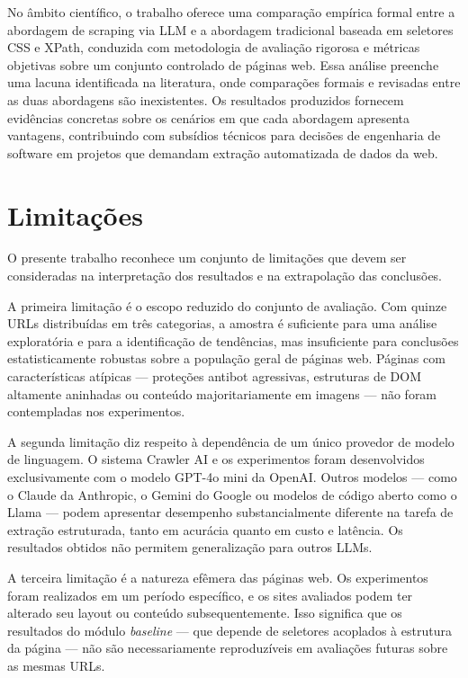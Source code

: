 \documentclass[tcc,capa]{texifsul}
\begin{document}
No âmbito científico, o trabalho oferece uma comparação empírica formal entre a abordagem de scraping via LLM e a abordagem tradicional baseada em seletores CSS e XPath, conduzida com metodologia de avaliação rigorosa e métricas objetivas sobre um conjunto controlado de páginas web. Essa análise preenche uma lacuna identificada na literatura, onde comparações formais e revisadas entre as duas abordagens são inexistentes. Os resultados produzidos fornecem evidências concretas sobre os cenários em que cada abordagem apresenta vantagens, contribuindo com subsídios técnicos para decisões de engenharia de software em projetos que demandam extração automatizada de dados da web.

\section{Limitações}

O presente trabalho reconhece um conjunto de limitações que devem ser consideradas na interpretação dos resultados e na extrapolação das conclusões.

A primeira limitação é o escopo reduzido do conjunto de avaliação. Com quinze URLs distribuídas em três categorias, a amostra é suficiente para uma análise exploratória e para a identificação de tendências, mas insuficiente para conclusões estatisticamente robustas sobre a população geral de páginas web. Páginas com características atípicas — proteções antibot agressivas, estruturas de DOM altamente aninhadas ou conteúdo majoritariamente em imagens — não foram contempladas nos experimentos.

A segunda limitação diz respeito à dependência de um único provedor de modelo de linguagem. O sistema Crawler AI e os experimentos foram desenvolvidos exclusivamente com o modelo GPT-4o mini da OpenAI. Outros modelos — como o Claude da Anthropic, o Gemini do Google ou modelos de código aberto como o Llama — podem apresentar desempenho substancialmente diferente na tarefa de extração estruturada, tanto em acurácia quanto em custo e latência. Os resultados obtidos não permitem generalização para outros LLMs.

A terceira limitação é a natureza efêmera das páginas web. Os experimentos foram realizados em um período específico, e os sites avaliados podem ter alterado seu layout ou conteúdo subsequentemente. Isso significa que os resultados do módulo \textit{baseline} — que depende de seletores acoplados à estrutura da página — não são necessariamente reproduzíveis em avaliações futuras sobre as mesmas URLs.
\end{document}
